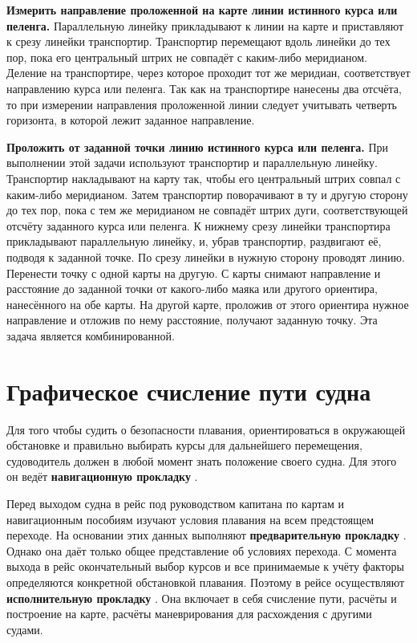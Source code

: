 \textbf{Измерить направление проложенной на карте линии истинного
  курса или пеленга.} Параллельную линейку прикладывают к линии на
карте и приставляют к срезу линейки транспортир. Транспортир
перемещают вдоль линейки до тех пор, пока его центральный штрих не
совпадёт с каким-либо меридианом. Деление на транспортире, через
которое проходит тот же меридиан, соответствует направлению курса или
пеленга. Так как на транспортире нанесены два отсчёта, то при
измерении направления проложенной линии следует учитывать четверть
горизонта, в которой лежит заданное направление.

\textbf{Проложить от заданной точки линию истинного курса или
  пеленга.} При выполнении этой задачи используют транспортир и
параллельную линейку. Транспортир накладывают на карту так, чтобы его
центральный штрих совпал с каким-либо меридианом. Затем транспортир
поворачивают в ту и другую сторону до тех пор, пока с тем же
меридианом не совпадёт штрих дуги, соответствующей отсчёту заданного
курса или пеленга. К нижнему срезу линейки транспортира прикладывают
параллельную линейку, и, убрав транспортир, раздвигают её, подводя к
заданной точке. По срезу линейки в нужную сторону проводят
линию. Перенести точку с одной карты на другую. С карты снимают
направление и расстояние до заданной точки от какого-либо маяка или
другого ориентира, нанесённого на обе карты. На другой карте, проложив
от этого ориентира нужное направление и отложив по нему расстояние,
получают заданную точку. Эта задача является комбинированной.

\section{Графическое счисление пути судна}

Для того чтобы судить о безопасности плавания, ориентироваться в
окружающей обстановке и правильно выбирать курсы для дальнейшего
перемещения, судоводитель должен в любой момент знать положение своего
судна. Для этого он ведёт \textbf{навигационную прокладку}
.

Перед выходом судна в рейс под руководством капитана по картам и
навигационным пособиям изучают условия плавания на всем предстоящем
переходе. На основании этих данных выполняют \textbf{предварительную
  прокладку} . Однако она даёт только
общее представление об условиях перехода. С момента выхода в рейс
окончательный выбор курсов и все принимаемые к учёту факторы
определяются конкретной обстановкой плавания. Поэтому в рейсе
осуществляют \textbf{исполнительную прокладку}
. Она включает в себя счисление пути,
расчёты и построение на карте, расчёты маневрирования для расхождения
с другими судами.

